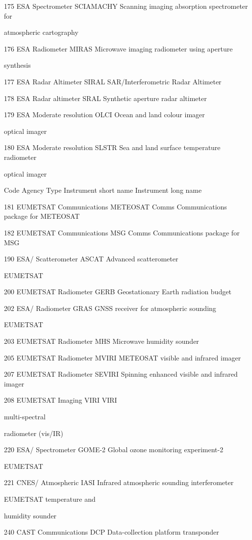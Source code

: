 175 ESA Spectrometer SCIAMACHY Scanning imaging absorption spectrometer for

atmospheric cartography

176 ESA Radiometer MIRAS Microwave imaging radiometer using aperture

synthesis

177 ESA Radar Altimeter SIRAL SAR/Interferometric Radar Altimeter

178 ESA Radar altimeter SRAL Synthetic aperture radar altimeter

179 ESA Moderate resolution OLCI Ocean and land colour imager

optical imager

180 ESA Moderate resolution SLSTR Sea and land surface temperature radiometer

optical imager

Code Agency Type Instrument short name Instrument long name

181 EUMETSAT Communications METEOSAT Comms Communications package for METEOSAT

182 EUMETSAT Communications MSG Comms Communications package for MSG

190 ESA/ Scatterometer ASCAT Advanced scatterometer

EUMETSAT

200 EUMETSAT Radiometer GERB Geostationary Earth radiation budget

202 ESA/ Radiometer GRAS GNSS receiver for atmospheric sounding

EUMETSAT

203 EUMETSAT Radiometer MHS Microwave humidity sounder

205 EUMETSAT Radiometer MVIRI METEOSAT visible and infrared imager

207 EUMETSAT Radiometer SEVIRI Spinning enhanced visible and infrared imager

208 EUMETSAT Imaging VIRI VIRI

multi-spectral

radiometer (vis/IR)

220 ESA/ Spectrometer GOME-2 Global ozone monitoring experiment-2

EUMETSAT

221 CNES/ Atmospheric IASI Infrared atmospheric sounding interferometer

EUMETSAT temperature and

humidity sounder

240 CAST Communications DCP Data-collection platform transponder

